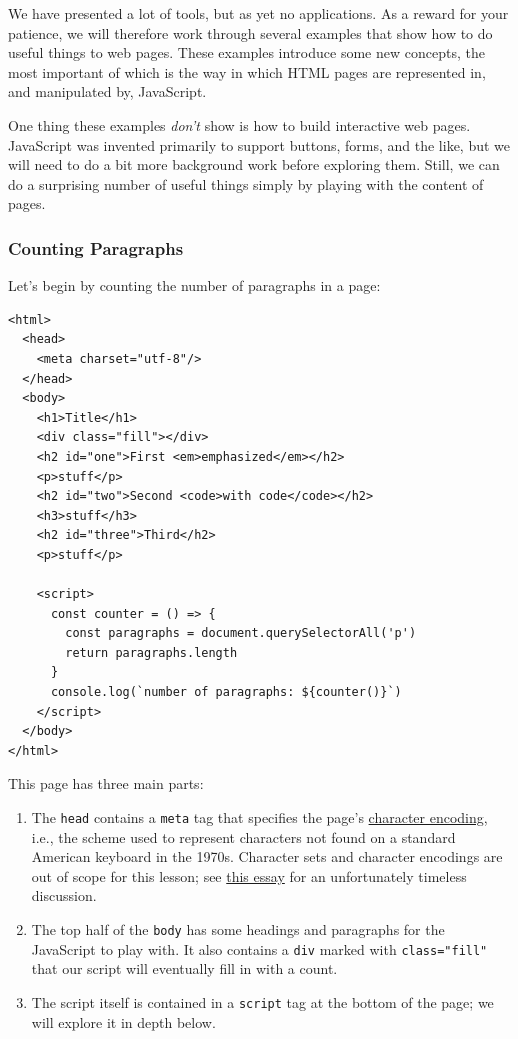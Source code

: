 We have presented a lot of tools, but as yet no applications. As a
reward for your patience, we will therefore work through several
examples that show how to do useful things to web pages. These examples
introduce some new concepts, the most important of which is the way in
which HTML pages are represented in, and manipulated by, JavaScript.

One thing these examples \emph{don't} show is how to build interactive
web pages. JavaScript was invented primarily to support buttons, forms,
and the like, but we will need to do a bit more background work before
exploring them. Still, we can do a surprising number of useful things
simply by playing with the content of pages.

\subsubsection{Counting Paragraphs}\label{s:pages-counting}

Let's begin by counting the number of paragraphs in a page:

\begin{verbatim}
<html>
  <head>
    <meta charset="utf-8"/>
  </head>
  <body>
    <h1>Title</h1>
    <div class="fill"></div>
    <h2 id="one">First <em>emphasized</em></h2>
    <p>stuff</p>
    <h2 id="two">Second <code>with code</code></h2>
    <h3>stuff</h3>
    <h2 id="three">Third</h2>
    <p>stuff</p>

    <script>
      const counter = () => {
        const paragraphs = document.querySelectorAll('p')
        return paragraphs.length
      }
      console.log(`number of paragraphs: ${counter()}`)
    </script>
  </body>
</html>
\end{verbatim}

This page has three main parts:

\begin{enumerate}
\item
  The \texttt{head} contains a \texttt{meta} tag that specifies the
  page's \protect\hyperlink{g:character-encoding}{character encoding},
  i.e., the scheme used to represent characters not found on a standard
  American keyboard in the 1970s. Character sets and character encodings
  are out of scope for this lesson; see
  \href{https://www.joelonsoftware.com/2003/10/08/the-absolute-minimum-every-software-developer-absolutely-positively-must-know-about-unicode-and-character-sets-no-excuses/}{this
  essay} for an unfortunately timeless discussion.
\item
  The top half of the \texttt{body} has some headings and paragraphs for
  the JavaScript to play with. It also contains a \texttt{div} marked
  with \texttt{class="fill"} that our script will eventually fill in
  with a count.
\item
  The script itself is contained in a \texttt{script} tag at the bottom
  of the page; we will explore it in depth below.
\end{enumerate}

